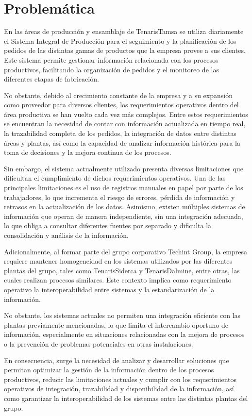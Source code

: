 \section{Problemática}

En las áreas de producción y ensamblaje de TenarisTamsa se utiliza diariamente el Sistema Integral de Producción para el seguimiento y la planificación de los pedidos de las distintas gamas de productos que la empresa provee a sus clientes. Este sistema permite gestionar información relacionada con los procesos productivos, facilitando la organización de pedidos y el monitoreo de las diferentes etapas de fabricación.

No obstante, debido al crecimiento constante de la empresa y a su expansión como proveedor para diversos clientes, los requerimientos operativos dentro del área productiva se han vuelto cada vez más complejos. Entre estos requerimientos se encuentran la necesidad de contar con información actualizada en tiempo real, la trazabilidad completa de los pedidos, la integración de datos entre distintas áreas y plantas, así como la capacidad de analizar información histórica para la toma de decisiones y la mejora continua de los procesos.

Sin embargo, el sistema actualmente utilizado presenta diversas limitaciones que dificultan el cumplimiento de dichos requerimientos operativos. Una de las principales limitaciones es el uso de registros manuales en papel por parte de los trabajadores, lo que incrementa el riesgo de errores, pérdida de información y retrasos en la actualización de los datos. Asimismo, existen múltiples sistemas de información que operan de manera independiente, sin una integración adecuada, lo que obliga a consultar diferentes fuentes por separado y dificulta la consolidación y análisis de la información.

Adicionalmente, al formar parte del grupo corporativo Techint Group, la empresa requiere mantener homogeneidad en los sistemas utilizados por las diferentes plantas del grupo, tales como TenarisSiderca y TenarisDalmine, entre otras, las cuales realizan procesos similares. Este contexto implica como requerimiento operativo la interoperabilidad entre sistemas y la estandarización de la información.

No obstante, los sistemas actuales no permiten una integración eficiente con las plantas previamente mencionadas, lo que limita el intercambio oportuno de información, especialmente en situaciones relacionadas con la mejora de procesos o la prevención de problemas potenciales en otras instalaciones.

En consecuencia, surge la necesidad de analizar y desarrollar soluciones que permitan optimizar la gestión de la información dentro de los procesos productivos, reducir las limitaciones actuales y cumplir con los requerimientos operativos de integración, trazabilidad y disponibilidad de la información, así como garantizar la interoperabilidad de los sistemas entre las distintas plantas del grupo.